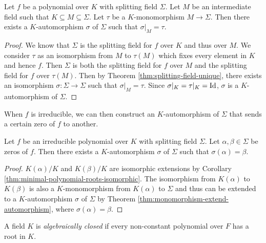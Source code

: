 \begin{theorem} \label{thm:monomorphism-extend-automorphism}
	Let $f$ be a polynomial over $K$ with splitting field $\Sigma$. Let $M$ be an intermediate field such that $K \subseteq M \subseteq \Sigma$. Let $\tau$ be a $K$-monomorphism $M \to \Sigma$. Then there exists a $K$-automorphism $\sigma$ of $\Sigma$ such that $\sigma | _M = \tau$.  
\end{theorem}

\begin{proof}
	We know that $\Sigma$ is the splitting field for $f$ over $K$ and thus over $M$. We consider $\tau$ as an isomorphism from $M$ to $\tau(M)$ which fixes every element in $K$ and hence $f$. Then $\Sigma$ is both the splitting field for $f$ over $M$ and the splitting field for $f$ over $\tau(M)$. Then by Theorem \ref{thm:splitting-field-unique}, there exists an isomorphism $\sigma: \Sigma \to \Sigma$ such that $\sigma | _M = \tau$. Since $\sigma | _K = \tau |_K = \operatorname{Id}$, $\sigma$ is a $K$-automorphism of $\Sigma$. 
\end{proof}

When $f$ is irreducible, we can then construct an $K$-automorphism of $\Sigma$ that sends a certain zero of $f$ to another.

\begin{theorem} \label{thm:automorphism-from-zeros}
	Let $f$ be an irreducible polynomial over $K$ with splitting field $\Sigma$. Let $\alpha, \beta \in \Sigma$ be zeros of $f$. Then there exists a $K$-automorphism $\sigma$ of $\Sigma$ such that $\sigma(\alpha) = \beta$. 
\end{theorem}

\begin{proof}
	$K(\alpha)/K$ and $K(\beta)/K$ are isomorphic extensions by Corollary \ref{thm:minimal-polynomial-roots-isomorphic}. The isomorphism from $K(\alpha)$ to $K(\beta)$ is also a $K$-monomorphism from $K(\alpha)$ to $\Sigma$ and thus can be extended to a $K$-automorphism $\sigma$ of $\Sigma$ by Theorem \ref{thm:monomorphism-extend-automorphism}, where $\sigma(\alpha) = \beta$.
\end{proof}


\begin{definition}
	A field $K$ is \textit{algebraically closed} if every non-constant polynomial over $F$ has a root in $K$. 
\end{definition}

